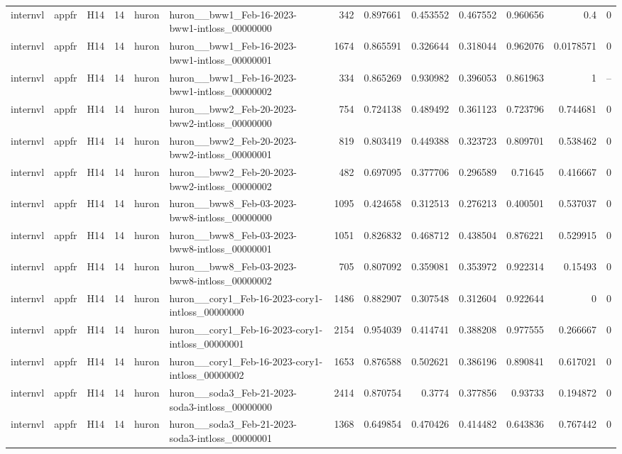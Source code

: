 \begin{longtable}{lllrllrrrrrrr}
internvl & appfr & H14 & 14 & huron & huron\_\_bww1\_Feb-16-2023-bww1-intloss\_00000000 & 342 & 0.897661 & 0.453552 & 0.467552 & 0.960656 & 0.4 & 0 \\
internvl & appfr & H14 & 14 & huron & huron\_\_bww1\_Feb-16-2023-bww1-intloss\_00000001 & 1674 & 0.865591 & 0.326644 & 0.318044 & 0.962076 & 0.0178571 & 0 \\
internvl & appfr & H14 & 14 & huron & huron\_\_bww1\_Feb-16-2023-bww1-intloss\_00000002 & 334 & 0.865269 & 0.930982 & 0.396053 & 0.861963 & 1 & -- \\
internvl & appfr & H14 & 14 & huron & huron\_\_bww2\_Feb-20-2023-bww2-intloss\_00000000 & 754 & 0.724138 & 0.489492 & 0.361123 & 0.723796 & 0.744681 & 0 \\
internvl & appfr & H14 & 14 & huron & huron\_\_bww2\_Feb-20-2023-bww2-intloss\_00000001 & 819 & 0.803419 & 0.449388 & 0.323723 & 0.809701 & 0.538462 & 0 \\
internvl & appfr & H14 & 14 & huron & huron\_\_bww2\_Feb-20-2023-bww2-intloss\_00000002 & 482 & 0.697095 & 0.377706 & 0.296589 & 0.71645 & 0.416667 & 0 \\
internvl & appfr & H14 & 14 & huron & huron\_\_bww8\_Feb-03-2023-bww8-intloss\_00000000 & 1095 & 0.424658 & 0.312513 & 0.276213 & 0.400501 & 0.537037 & 0 \\
internvl & appfr & H14 & 14 & huron & huron\_\_bww8\_Feb-03-2023-bww8-intloss\_00000001 & 1051 & 0.826832 & 0.468712 & 0.438504 & 0.876221 & 0.529915 & 0 \\
internvl & appfr & H14 & 14 & huron & huron\_\_bww8\_Feb-03-2023-bww8-intloss\_00000002 & 705 & 0.807092 & 0.359081 & 0.353972 & 0.922314 & 0.15493 & 0 \\
internvl & appfr & H14 & 14 & huron & huron\_\_cory1\_Feb-16-2023-cory1-intloss\_00000000 & 1486 & 0.882907 & 0.307548 & 0.312604 & 0.922644 & 0 & 0 \\
internvl & appfr & H14 & 14 & huron & huron\_\_cory1\_Feb-16-2023-cory1-intloss\_00000001 & 2154 & 0.954039 & 0.414741 & 0.388208 & 0.977555 & 0.266667 & 0 \\
internvl & appfr & H14 & 14 & huron & huron\_\_cory1\_Feb-16-2023-cory1-intloss\_00000002 & 1653 & 0.876588 & 0.502621 & 0.386196 & 0.890841 & 0.617021 & 0 \\
internvl & appfr & H14 & 14 & huron & huron\_\_soda3\_Feb-21-2023-soda3-intloss\_00000000 & 2414 & 0.870754 & 0.3774 & 0.377856 & 0.93733 & 0.194872 & 0 \\
internvl & appfr & H14 & 14 & huron & huron\_\_soda3\_Feb-21-2023-soda3-intloss\_00000001 & 1368 & 0.649854 & 0.470426 & 0.414482 & 0.643836 & 0.767442 & 0 \\

\end{longtable}
